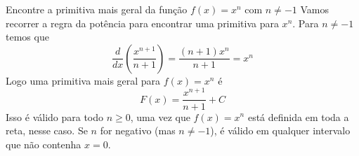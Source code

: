 \begin{example}
  Encontre a primitiva mais geral da função \(f(x)= x^n\) com \(n \neq -1\)
  \solution
  Vamos recorrer a regra da potência para encontrar uma primitiva para $x^n$.
  Para $n \neq -1$ temos que
  \[
    \frac{d}{dx} \left( \frac{x^{n+1}}{n+1}\right)
    = \frac{(n+1)x^n}{n+1}=x^n
  \]
  Logo uma primitiva mais geral para $f(x)=x^n$ é
  \[
    F(x)=\frac{x^{n+1}}{n+1}+ C
  \]
  Isso é válido para todo $n \geq 0$, uma vez que $f(x)=x^n$ está
  definida em toda a reta, nesse caso. Se $n$ for negativo
  (mas $n \neq -1$), é válido em qualquer intervalo que não contenha $x=0$.
\end{example}


